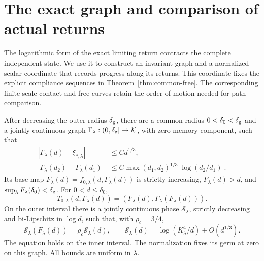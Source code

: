 \section{The exact graph and comparison of actual returns}
\label{sec:graph}
The logarithmic form of the exact limiting return contracts the
complete independent state. We use it to construct an invariant graph
and a normalized scalar coordinate that records progress along its
returns. This coordinate fixes the explicit compliance sequences in
Theorem~\ref{thm:common-free}. The corresponding finite-scale contact and
free curves retain the order of motion needed for path comparison.

\begin{proposition}
\label{prop:canonical-graph-phase}
After decreasing the outer radius $\delta_{\rm g}$, there are a common
radius $0<\delta_0<\delta_{\rm g}$ and a jointly
continuous graph $\Gamma_\lambda:(0,\delta_{\rm g}]\to\mathcal K$,
with zero memory component, such that
\begin{equation}
 \begin{aligned}
 |\Gamma_\lambda(d)-\xi_{*,\lambda}|&\le Cd^{1/3},\\
 |\Gamma_\lambda(d_2)-\Gamma_\lambda(d_1)|
 &\le C\max(d_1,d_2)^{1/3}|\log(d_2/d_1)|.
 \end{aligned}\label{gr:graph-bounds}
\end{equation}
Its base map $F_\lambda(d)=f_{0,\lambda}(d,\Gamma_\lambda(d))$
is strictly increasing, $F_\lambda(d)>d$, and
$\sup_\lambda F_\lambda(\delta_0)<\delta_{\rm g}$. For
$0<d\le\delta_0$,
\begin{equation}
 T_{0,\lambda}(d,\Gamma_\lambda(d))
      =(F_\lambda(d),\Gamma_\lambda(F_\lambda(d))).
 \label{gr:invariance}
\end{equation}
On the outer interval there is a jointly continuous phase
$\mathcal S_\lambda$, strictly decreasing and bi-Lipschitz in $\log d$,
such that, with $\rho_c=3/4$,
\begin{equation}
 \mathcal S_\lambda(F_\lambda(d))
       =\rho_c\mathcal S_\lambda(d),\qquad
 \mathcal S_\lambda(d)=\log(K_\lambda^4/d)+O(d^{1/3}).
 \label{eq:canonical-Schroeder}
\end{equation}
The equation holds on the inner interval. The normalization fixes its
germ at zero on this graph. All bounds are uniform in $\lambda$.
\end{proposition}
